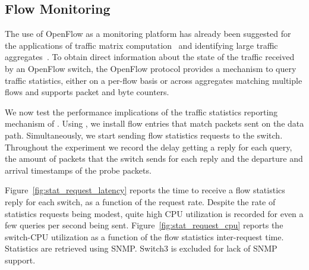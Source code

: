 \subsection{Flow Monitoring}\label{sec:results-monitoring}

The use of OpenFlow as a monitoring platform has already been suggested for the
applications of traffic matrix computation~\cite{opentm-pam,tm-presto} and
identifying large traffic aggregates~\cite{openflow-measurement-hotice}. To
obtain direct information about the state of the traffic received by an OpenFlow
switch, the OpenFlow protocol provides a mechanism to query traffic statistics,
either on a per-flow basis or across aggregates matching multiple flows and
supports packet and byte counters. 

We now test the performance implications of the traffic statistics reporting
mechanism of \of. Using \oflops, we install flow entries that match packets sent
on the data path. Simultaneously, we start sending flow statistics requests to
the switch. Throughout the experiment we record the delay getting a reply for
each query, the amount of packets that the switch sends for each reply and the
departure and arrival timestamps of the probe packets.

Figure~\ref{fig:stat_request_latency} reports the time to receive a flow
statistics reply for each switch, as a function of the request rate. Despite the
rate of statistics requests being modest, quite high CPU utilization is recorded
for even a few queries per second being sent. Figure~\ref{fig:stat_request_cpu}
reports the switch-CPU utilization as a function of the flow statistics
inter-request time. Statistics are retrieved using SNMP. Switch3 is excluded for
lack of SNMP support.

